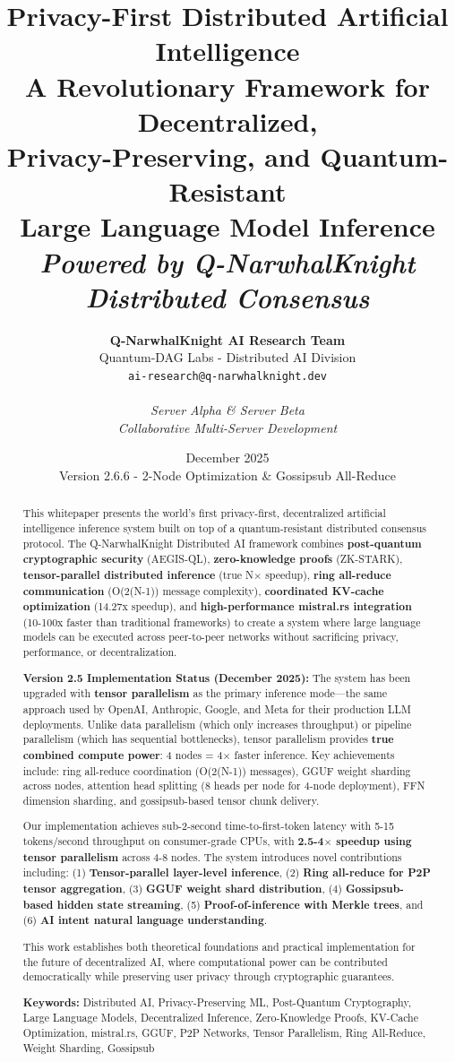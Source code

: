 \documentclass[11pt,a4paper]{article}
\title{\textbf{\Huge Privacy-First Distributed Artificial Intelligence}\\
\vspace{0.5cm}
{\Large A Revolutionary Framework for Decentralized,\\
Privacy-Preserving, and Quantum-Resistant\\
Large Language Model Inference}\\
\vspace{0.5cm}
{\large \textit{Powered by Q-NarwhalKnight Distributed Consensus}}}
\author{
\textbf{Q-NarwhalKnight AI Research Team}\\
Quantum-DAG Labs - Distributed AI Division\\
\texttt{ai-research@q-narwhalknight.dev}\\
\\
\textit{Server Alpha \& Server Beta}\\
\textit{Collaborative Multi-Server Development}
}
\date{December 2025\\Version 2.6.6 - 2-Node Optimization \& Gossipsub All-Reduce}
\begin{document}
\maketitle

\begin{abstract}
This whitepaper presents the world's first privacy-first, decentralized artificial intelligence inference system built on top of a quantum-resistant distributed consensus protocol. The Q-NarwhalKnight Distributed AI framework combines \textbf{post-quantum cryptographic security} (AEGIS-QL), \textbf{zero-knowledge proofs} (ZK-STARK), \textbf{tensor-parallel distributed inference} (true N$\times$ speedup), \textbf{ring all-reduce communication} (O(2(N-1)) message complexity), \textbf{coordinated KV-cache optimization} (14.27x speedup), and \textbf{high-performance mistral.rs integration} (10-100x faster than traditional frameworks) to create a system where large language models can be executed across peer-to-peer networks without sacrificing privacy, performance, or decentralization.

\textbf{Version 2.5 Implementation Status (December 2025):} The system has been upgraded with \textbf{tensor parallelism} as the primary inference mode---the same approach used by OpenAI, Anthropic, Google, and Meta for their production LLM deployments. Unlike data parallelism (which only increases throughput) or pipeline parallelism (which has sequential bottlenecks), tensor parallelism provides \textbf{true combined compute power}: 4 nodes = 4$\times$ faster inference. Key achievements include: ring all-reduce coordination (O(2(N-1)) messages), GGUF weight sharding across nodes, attention head splitting (8 heads per node for 4-node deployment), FFN dimension sharding, and gossipsub-based tensor chunk delivery.

Our implementation achieves sub-2-second time-to-first-token latency with 5-15 tokens/second throughput on consumer-grade CPUs, with \textbf{2.5-4$\times$ speedup using tensor parallelism} across 4-8 nodes. The system introduces novel contributions including: (1) \textbf{Tensor-parallel layer-level inference}, (2) \textbf{Ring all-reduce for P2P tensor aggregation}, (3) \textbf{GGUF weight shard distribution}, (4) \textbf{Gossipsub-based hidden state streaming}, (5) \textbf{Proof-of-inference with Merkle trees}, and (6) \textbf{AI intent natural language understanding}.

This work establishes both theoretical foundations and practical implementation for the future of decentralized AI, where computational power can be contributed democratically while preserving user privacy through cryptographic guarantees.

\textbf{Keywords:} Distributed AI, Privacy-Preserving ML, Post-Quantum Cryptography, Large Language Models, Decentralized Inference, Zero-Knowledge Proofs, KV-Cache Optimization, mistral.rs, GGUF, P2P Networks, Tensor Parallelism, Ring All-Reduce, Weight Sharding, Gossipsub
\end{abstract}
\end{document}
